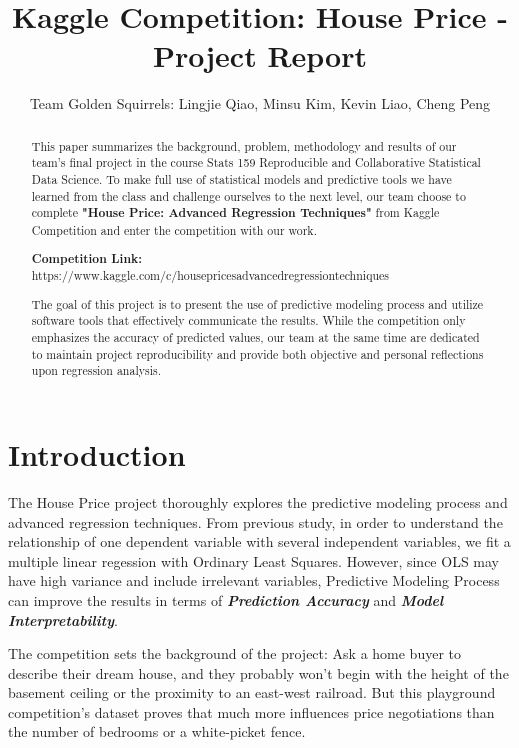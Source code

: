 \documentclass[a4paper]{article}
\title{Kaggle Competition: House Price - Project Report}
\author{Team Golden Squirrels: Lingjie Qiao, Minsu Kim, Kevin Liao, Cheng Peng}
\begin{document}

\maketitle


\begin{abstract}

This paper summarizes the background, problem, methodology and results of our team's final project in the course Stats 159 Reproducible and Collaborative Statistical Data Science. To make full use of statistical models and predictive tools we have learned from the class and challenge ourselves to the next level, our team choose to complete \textbf{"House Price: Advanced Regression Techniques"} from Kaggle Competition and enter the competition with our work. \newline

\textbf{Competition Link:} https://www.kaggle.com/c/house\hspace{0pt}prices\hspace{0pt}advanced\hspace{0pt}regression\hspace{0pt}techniques \newline

The goal of this project is to present the use of predictive modeling process and utilize software tools that effectively communicate the results. While the competition only emphasizes the accuracy of predicted values, our team at the same time are dedicated to maintain project reproducibility and provide both objective and personal reflections upon regression analysis. \newline
\end{abstract}


\section{Introduction}
The House Price project thoroughly explores the predictive modeling process and advanced regression techniques. From previous study, in order to understand the relationship of one dependent variable with several independent variables, we fit a multiple linear regession with Ordinary Least Squares. However, since OLS may have high variance and include irrelevant variables, Predictive Modeling Process can improve the results in terms of \textbf{\textit{Prediction Accuracy}} and \textbf{\textit{Model Interpretability}}. \newline

The competition sets the background of the project: Ask a home buyer to describe their dream house, and they probably won't begin with the height of the basement ceiling or the proximity to an east-west railroad. But this playground competition's dataset proves that much more influences price negotiations than the number of bedrooms or a white-picket fence. \newline
\end{document}
